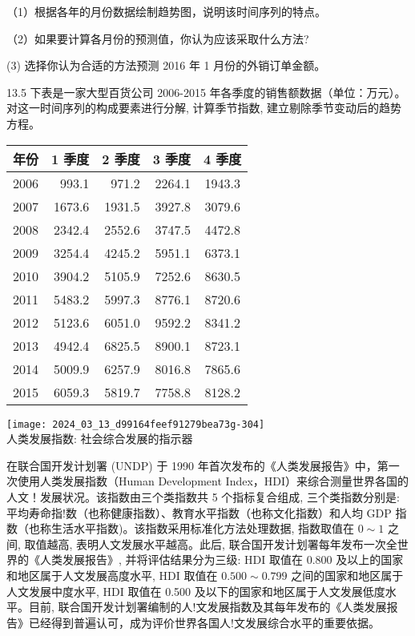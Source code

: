 \documentclass[10pt]{article}
\begin{document}
\begin{CJK*}{UTF8}{bsmi}
（1）根据各年的月份数据绘制趋势图，说明该时间序列的特点。

（2）如果要计算各月份的预测值，你认为应该采取什么方法?

(3) 选择你认为合适的方法预测 2016 年 1 月份的外销订单金额。

13.5 下表是一家大型百货公司 2006-2015 年各季度的销售额数据（单位：万元）。对这一时间序列的构成要素进行分解, 计算季节指数, 建立剔除季节变动后的趋势方程。

\begin{center}
\begin{tabular}{rrrrc}
\hline
年份 & 1 季度 & 2 季度 & 3 季度 & 4 季度 \\
\hline
2006 & 993.1 & 971.2 & 2264.1 & 1943.3 \\
2007 & 1673.6 & 1931.5 & 3927.8 & 3079.6 \\
2008 & 2342.4 & 2552.6 & 3747.5 & 4472.8 \\
2009 & 3254.4 & 4245.2 & 5951.1 & 6373.1 \\
2010 & 3904.2 & 5105.9 & 7252.6 & 8630.5 \\
2011 & 5483.2 & 5997.3 & 8776.1 & 8720.6 \\
2012 & 5123.6 & 6051.0 & 9592.2 & 8341.2 \\
2013 & 4942.4 & 6825.5 & 8900.1 & 8723.1 \\
2014 & 5009.9 & 6257.9 & 8016.8 & 7865.6 \\
2015 & 6059.3 & 5819.7 & 7758.8 & 8128.2 \\
\hline
\end{tabular}
\end{center}

\texttt{[image: 2024\_03\_13\_d99164feef91279bea73g-304]}\\
人类发展指数: 社会综合发展的指示器

在联合国开发计划署 (UNDP) 于 1990 年首次发布的《人类发展报告》中，第一次使用人类发展指数（Human Development Index，HDI）来综合测量世界各国的人文！发展状况。该指数由三个类指数共 5 个指标复合组成, 三个类指数分别是: 平均寿命指!数（也称健康指数）、教育水平指数（也称文化指数）和人均 GDP 指数（也称生活水平指数)。该指数采用标准化方法处理数据, 指数取值在 $0 \sim 1$ 之间, 取值越高, 表明人文发展水平越高。此后, 联合国开发计划署每年发布一次全世界的《人类发展报告》, 并将评估结果分为三级: HDI 取值在 0.800 及以上的国家和地区属于人文发展高度水平, HDI 取值在 $0.500 \sim 0.799$ 之间的国家和地区属于人文发展中度水平, HDI 取值在 0.500 及以下的国家和地区属于人文发展低度水平。目前, 联合国开发计划署编制的人!文发展指数及其每年发布的《人类发展报告》已经得到普遍认可，成为评价世界各国人!文发展综合水平的重要依据。


\end{CJK*}
\end{document}
